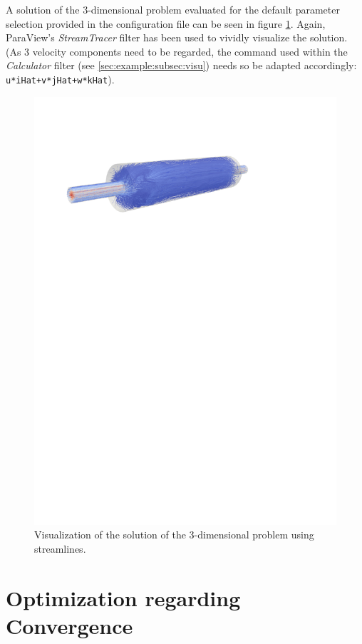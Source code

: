 \documentclass{article}
\begin{document}
A solution of the 3-dimensional problem evaluated for the default parameter selection provided in the configuration file can be seen in figure \ref{fig:3d2}. Again, ParaView's \emph{StreamTracer} filter has been used to vividly visualize the solution. (As 3 velocity components need to be regarded, the command used within the \emph{Calculator} filter (see \ref{sec:example:subsec:visu}) needs so be adapted accordingly: \texttt{u*iHat+v*jHat+w*kHat}).

\begin{figure}[!ht]
    \includegraphics[width=\textwidth,trim=2cm 20.7cm 6cm 3.5cm, clip=true]{fig/3d2.pdf}
\caption{Visualization of the solution of the 3-dimensional problem using streamlines.}\label{fig:3d2}
\end{figure}


\pagebreak

\section{Optimization regarding Convergence}
\label{sec:conti_weight}
\end{document}
